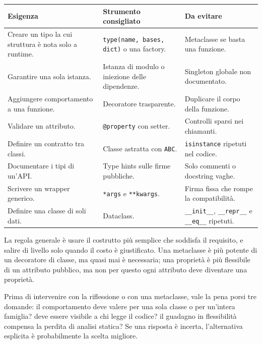 \documentclass[12pt]{extarticle}
\begin{document}
\begin{center}
\small
\begin{tabular}{p{4.2cm}p{5.4cm}p{4.8cm}}
    \toprule
    \textbf{Esigenza} & \textbf{Strumento consigliato} & \textbf{Da evitare} \\
    \midrule
    Creare un tipo la cui struttura è nota solo a runtime. & \texttt{type(name, bases, dict)} o una factory. & Metaclasse se basta una funzione. \\
    \addlinespace
    Garantire una sola istanza. & Istanza di modulo o iniezione delle dipendenze. & Singleton globale non documentato. \\
    \addlinespace
    Aggiungere comportamento a una funzione. & Decoratore trasparente. & Duplicare il corpo della funzione. \\
    \addlinespace
    Validare un attributo. & \texttt{@property} con setter. & Controlli sparsi nei chiamanti. \\
    \addlinespace
    Definire un contratto tra classi. & Classe astratta con \texttt{ABC}. & \texttt{isinstance} ripetuti nel codice. \\
    \addlinespace
    Documentare i tipi di un'API. & Type hints sulle firme pubbliche. & Solo commenti o docstring vaghe. \\
    \addlinespace
    Scrivere un wrapper generico. & \texttt{*args} e \texttt{**kwargs}. & Firma fissa che rompe la compatibilità. \\
    \addlinespace
    Definire una classe di soli dati. & Dataclass. & \texttt{\_\_init\_\_}, \texttt{\_\_repr\_\_} e \texttt{\_\_eq\_\_} ripetuti. \\
    \bottomrule
\end{tabular}
\end{center}

\noindent La regola generale è usare il costrutto più semplice che soddisfa il requisito, e salire di livello solo quando il costo è giustificato. Una metaclasse è più potente di un decoratore di classe, ma quasi mai è necessaria; una proprietà è più flessibile di un attributo pubblico, ma non per questo ogni attributo deve diventare una proprietà.

\noindent Prima di intervenire con la riflessione o con una metaclasse, vale la pena porsi tre domande: il comportamento deve valere per una sola classe o per un'intera famiglia? deve essere visibile a chi legge il codice? il guadagno in flessibilità compensa la perdita di analisi statica? Se una risposta è incerta, l'alternativa esplicita è probabilmente la scelta migliore.
\end{document}
